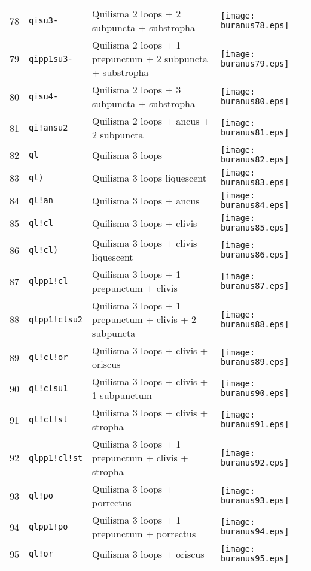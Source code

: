 \documentclass{scrarticle}
\begin{document}
\begin{longtable}{l|l|l|l}
78 & \texttt{qisu3-} & Quilisma 2 loops + 2 subpuncta + substropha & \texttt{[image: buranus78.eps]} \\
79 & \texttt{qipp1su3-} & Quilisma 2 loops + 1 prepunctum + 2 subpuncta + substropha & \texttt{[image: buranus79.eps]} \\
80 & \texttt{qisu4-} & Quilisma 2 loops + 3 subpuncta + substropha & \texttt{[image: buranus80.eps]} \\
81 & \texttt{qi!ansu2} & Quilisma 2 loops + ancus + 2 subpuncta & \texttt{[image: buranus81.eps]} \\
82 & \texttt{ql} & Quilisma 3 loops & \texttt{[image: buranus82.eps]} \\
83 & \texttt{ql)} & Quilisma 3 loops liquescent & \texttt{[image: buranus83.eps]} \\
84 & \texttt{ql!an} & Quilisma 3 loops + ancus & \texttt{[image: buranus84.eps]} \\
85 & \texttt{ql!cl} & Quilisma 3 loops + clivis & \texttt{[image: buranus85.eps]} \\
86 & \texttt{ql!cl)} & Quilisma 3 loops + clivis liquescent & \texttt{[image: buranus86.eps]} \\
87 & \texttt{qlpp1!cl} & Quilisma 3 loops + 1 prepunctum + clivis & \texttt{[image: buranus87.eps]} \\
88 & \texttt{qlpp1!clsu2} & Quilisma 3 loops + 1 prepunctum + clivis + 2 subpuncta & \texttt{[image: buranus88.eps]} \\
89 & \texttt{ql!cl!or} & Quilisma 3 loops + clivis + oriscus & \texttt{[image: buranus89.eps]} \\
90 & \texttt{ql!clsu1} & Quilisma 3 loops + clivis + 1 subpunctum & \texttt{[image: buranus90.eps]} \\
91 & \texttt{ql!cl!st} & Quilisma 3 loops + clivis + stropha & \texttt{[image: buranus91.eps]} \\
92 & \texttt{qlpp1!cl!st} & Quilisma 3 loops + 1 prepunctum + clivis + stropha & \texttt{[image: buranus92.eps]} \\
93 & \texttt{ql!po} & Quilisma 3 loops + porrectus & \texttt{[image: buranus93.eps]} \\
94 & \texttt{qlpp1!po} & Quilisma 3 loops + 1 prepunctum + porrectus & \texttt{[image: buranus94.eps]} \\
95 & \texttt{ql!or} & Quilisma 3 loops + oriscus & \texttt{[image: buranus95.eps]} \\

\end{longtable}
\end{document}
